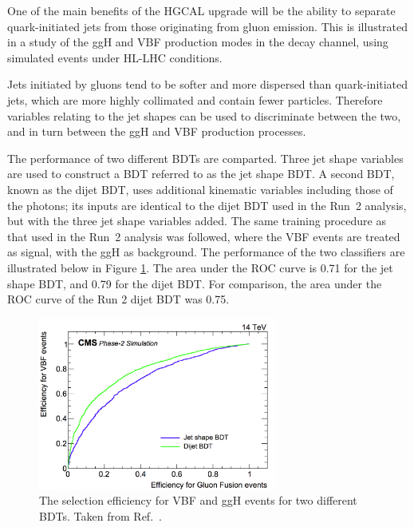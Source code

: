 One of the main benefits of the HGCAL upgrade will be the ability to separate quark-initiated jets from those originating from gluon emission.
This is illustrated in a study of the ggH and VBF production modes in the \Hgg decay channel, using simulated events under HL-LHC conditions.

Jets initiated by gluons tend to be softer and more dispersed than quark-initiated jets, which are more highly collimated and contain fewer particles. 
Therefore variables relating to the jet shapes can be used to discriminate between the two, and in turn between the ggH and VBF production processes.

The performance of two different BDTs are comparted. 
Three jet shape variables are used to construct a BDT referred to as the jet shape BDT.
A second BDT, known as the dijet BDT, uses additional kinematic variables including those of the photons; 
its inputs are identical to the dijet BDT used in the Run~2 analysis, but with the three jet shape variables added.
The same training procedure as that used in the Run~2 analysis was followed, 
where the VBF events are treated as signal, with the ggH as background.
The performance of the two classifiers are illustrated below in Figure \ref{fig:hgcal_VBFvsGGH}.
The area under the ROC curve is 0.71 for the jet shape BDT, and 0.79 for the dijet BDT.
For comparison, the area under the ROC curve of the Run 2 dijet BDT was 0.75.

\begin{figure}[h!]
  \centering
  \includegraphics[width=0.7\textwidth]{Figures/HGCAL/VBFvsGGH.png}
  \caption[VBF and ggH selection efficiencies for two BDTs.]
  {
    The selection efficiency for VBF and ggH events for two different BDTs. 
    Taken from Ref.~\cite{HGCAL}.
  }
  \label{fig:hgcal_VBFvsGGH}
\end{figure}

